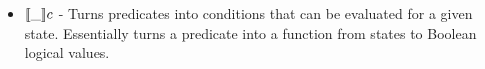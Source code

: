 \begin{itemize}
    \item $\llbracket \_ \rrbracket c$ - Turns predicates into conditions that can be evaluated for a given state. Essentially turns a predicate into a function from states to Boolean logical values.
    \begin{code}
        \>[2]\AgdaSpace{}%
        \AgdaSymbol{:}\AgdaSpace{}%
        \<%
        \\
        \>[2]\AgdaSpace{}%
        \AgdaSymbol{=}\AgdaSpace{}%
        \AgdaSpace{}%
        \AgdaSpace{}%
        \<%
        \\
        \>[2]\AgdaSpace{}%
        \AgdaSymbol{:}\AgdaSpace{}%
        \AgdaSpace{}%
        \AgdaSpace{}%
        \<%
    \end{code}
\end{itemize}

